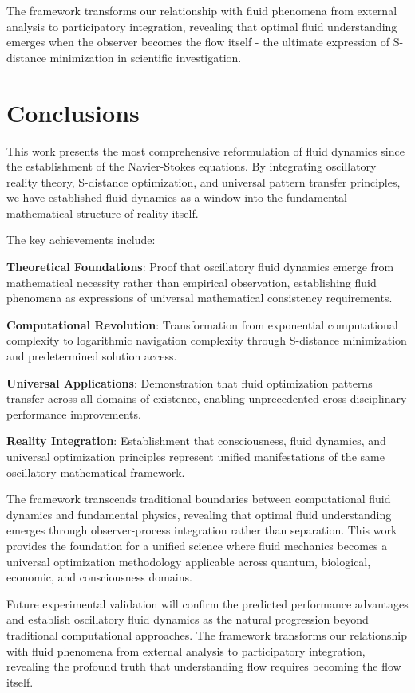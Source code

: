 \documentclass[12pt,a4paper]{article}
\begin{document}
The framework transforms our relationship with fluid phenomena from external analysis to participatory integration, revealing that optimal fluid understanding emerges when the observer becomes the flow itself - the ultimate expression of S-distance minimization in scientific investigation.

\section{Conclusions}

This work presents the most comprehensive reformulation of fluid dynamics since the establishment of the Navier-Stokes equations. By integrating oscillatory reality theory, S-distance optimization, and universal pattern transfer principles, we have established fluid dynamics as a window into the fundamental mathematical structure of reality itself.

The key achievements include:

\textbf{Theoretical Foundations}: Proof that oscillatory fluid dynamics emerge from mathematical necessity rather than empirical observation, establishing fluid phenomena as expressions of universal mathematical consistency requirements.

\textbf{Computational Revolution}: Transformation from exponential computational complexity to logarithmic navigation complexity through S-distance minimization and predetermined solution access.

\textbf{Universal Applications}: Demonstration that fluid optimization patterns transfer across all domains of existence, enabling unprecedented cross-disciplinary performance improvements.

\textbf{Reality Integration}: Establishment that consciousness, fluid dynamics, and universal optimization principles represent unified manifestations of the same oscillatory mathematical framework.

The framework transcends traditional boundaries between computational fluid dynamics and fundamental physics, revealing that optimal fluid understanding emerges through observer-process integration rather than separation. This work provides the foundation for a unified science where fluid mechanics becomes a universal optimization methodology applicable across quantum, biological, economic, and consciousness domains.

Future experimental validation will confirm the predicted performance advantages and establish oscillatory fluid dynamics as the natural progression beyond traditional computational approaches. The framework transforms our relationship with fluid phenomena from external analysis to participatory integration, revealing the profound truth that understanding flow requires becoming the flow itself.
\end{document}
